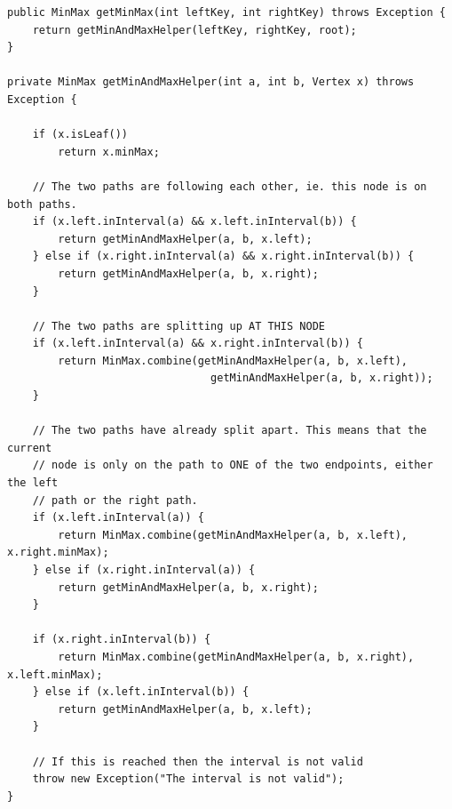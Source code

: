 \newpage
\begin{lstlisting}[caption=Java code for retrieving min and max in a query range
{[leftKey, rightKey]}, label=listing:get-min-max]
public MinMax getMinMax(int leftKey, int rightKey) throws Exception {
    return getMinAndMaxHelper(leftKey, rightKey, root);
}

private MinMax getMinAndMaxHelper(int a, int b, Vertex x) throws Exception {

    if (x.isLeaf())
        return x.minMax;

    // The two paths are following each other, ie. this node is on both paths.
    if (x.left.inInterval(a) && x.left.inInterval(b)) {
        return getMinAndMaxHelper(a, b, x.left);
    } else if (x.right.inInterval(a) && x.right.inInterval(b)) {
        return getMinAndMaxHelper(a, b, x.right);
    }

    // The two paths are splitting up AT THIS NODE
    if (x.left.inInterval(a) && x.right.inInterval(b)) {
        return MinMax.combine(getMinAndMaxHelper(a, b, x.left),
                                getMinAndMaxHelper(a, b, x.right));
    }

    // The two paths have already split apart. This means that the current
    // node is only on the path to ONE of the two endpoints, either the left
    // path or the right path.
    if (x.left.inInterval(a)) {
        return MinMax.combine(getMinAndMaxHelper(a, b, x.left), x.right.minMax);
    } else if (x.right.inInterval(a)) {
        return getMinAndMaxHelper(a, b, x.right);
    }

    if (x.right.inInterval(b)) {
        return MinMax.combine(getMinAndMaxHelper(a, b, x.right), x.left.minMax);
    } else if (x.left.inInterval(b)) {
        return getMinAndMaxHelper(a, b, x.left);
    }

    // If this is reached then the interval is not valid
    throw new Exception("The interval is not valid");
}
\end{lstlisting}


\clearpage
